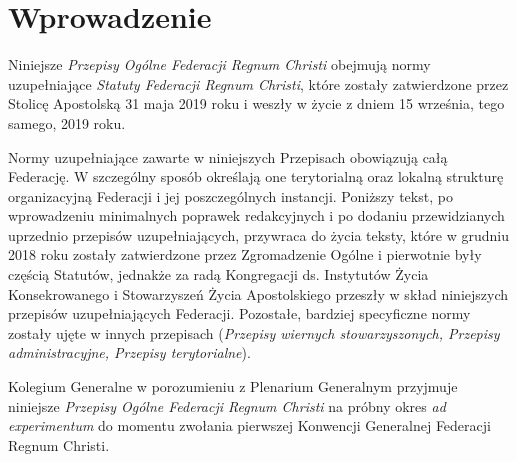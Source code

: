 ﻿

\section*{Wprowadzenie}  Niniejsze {\em Przepisy Ogólne Federacji Regnum Christi} obejmują normy uzupełniające {\em Statuty Federacji Regnum Christi}, które zostały zatwierdzone przez Stolicę Apostolską 31 maja 2019 roku i weszły w życie z dniem 15 września, tego samego, 2019 roku.

Normy uzupełniające zawarte w niniejszych Przepisach obowiązują całą Federację. W szczególny sposób określają one terytorialną oraz lokalną strukturę organizacyjną Federacji i jej poszczególnych instancji. Poniższy tekst, po wprowadzeniu minimalnych poprawek redakcyjnych i po dodaniu przewidzianych uprzednio przepisów uzupełniających, przywraca do życia teksty, które w grudniu 2018 roku zostały zatwierdzone przez Zgromadzenie Ogólne i pierwotnie były częścią Statutów, jednakże za radą Kongregacji ds. Instytutów Życia Konsekrowanego i Stowarzyszeń Życia Apostolskiego przeszły w skład niniejszych przepisów uzupełniających Federacji. Pozostałe, bardziej specyficzne normy zostały ujęte w innych przepisach ({\em Przepisy wiernych stowarzyszonych, Przepisy administracyjne, Przepisy terytorialne}).

Kolegium Generalne w porozumieniu z Plenarium Generalnym przyjmuje niniejsze {\em Przepisy Ogólne Federacji Regnum Christi} na próbny okres {\em ad experimentum} do momentu zwołania pierwszej Konwencji Generalnej Federacji Regnum Christi.

